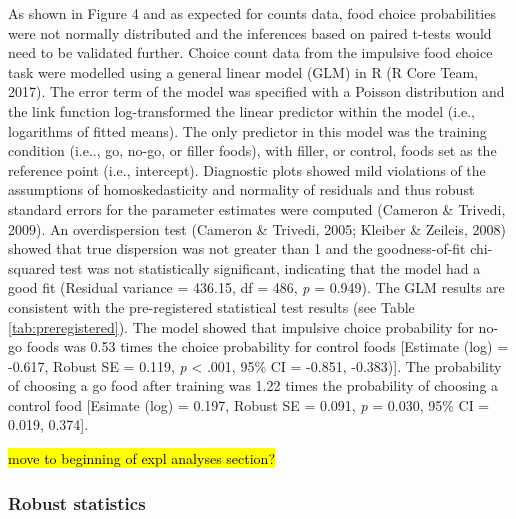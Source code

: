 \documentclass[man,floatsintext]{apa6}
\begin{document}
As shown in Figure 4 and as expected for counts data, food choice probabilities were not normally distributed and the inferences based on paired t-tests would need to be validated further. Choice count data from the impulsive food choice task were modelled using a general linear model (GLM) in R (R Core Team, 2017). The error term of the model was specified with a Poisson distribution and the link function log-transformed the linear predictor within the model (i.e., logarithms of fitted means). The only predictor in this model was the training condition (i.e.., go, no-go, or filler foods), with filler, or control, foods set as the reference point (i.e., intercept). Diagnostic plots showed mild violations of the assumptions of homoskedasticity and normality of residuals and thus robust standard errors for the parameter estimates were computed (Cameron \& Trivedi, 2009). An overdispersion test (Cameron \& Trivedi, 2005; Kleiber \& Zeileis, 2008) showed that true dispersion was not greater than 1 and the goodness-of-fit chi-squared test was not statistically significant, indicating that the model had a good fit (Residual variance = 436.15, df = 486, \emph{p} = 0.949). The GLM results are consistent with the pre-registered statistical test results (see Table \ref{tab:preregistered}). The model showed that impulsive choice probability for no-go foods was 0.53 times the choice probability for control foods {[}Estimate (log) = -0.617, Robust SE = 0.119, \emph{p} \textless{} .001, 95\% CI = -0.851, -0.383){]}. The probability of choosing a go food after training was 1.22 times the probability of choosing a control food {[}Esimate (log) = 0.197, Robust SE = 0.091, \emph{p} = 0.030, 95\% CI = 0.019, 0.374{]}.

\hl{move to beginning of expl analyses section?}

\par

\hypertarget{robust}{%
\subsubsection{Robust statistics}\label{robust}}
\end{document}
